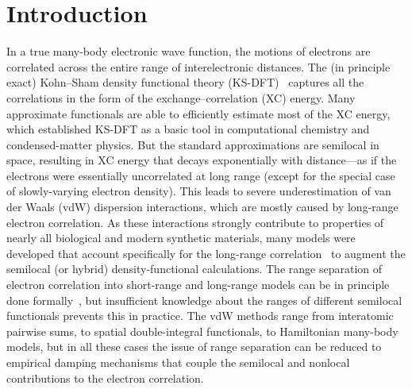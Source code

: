 \section{Introduction}

In a true many-body electronic wave function, the motions of electrons are correlated across the entire range of interelectronic distances.
The (in principle exact) Kohn--Sham density functional theory (KS-DFT)~\cite{KohnPR65} captures all the correlations in the form of the exchange--correlation (XC) energy.
Many approximate functionals are able to efficiently estimate most of the XC energy, which established KS-DFT as a basic tool in computational chemistry and condensed-matter physics.
But the standard approximations are semilocal in space, resulting in XC energy that decays exponentially with distance---as if the electrons were essentially uncorrelated at long range (except for the special case of slowly-varying electron density).
This leads to severe underestimation of van der Waals (vdW) dispersion interactions, which are mostly caused by long-range electron correlation.
As these interactions strongly contribute to properties of nearly all biological and modern synthetic materials, many models were developed that account specifically for the long-range correlation~\cite{DionPRL04,VydrovJCP10a,JohnsonJCP06,TkatchenkoPRL09,GrimmeJCP10,AmbrosettiJCP14} to augment the semilocal (or hybrid) density-functional calculations.
The range separation of electron correlation into short-range and long-range models can be in principle done formally~\cite{HermannCR17}, but insufficient knowledge about the ranges of different semilocal functionals prevents this in practice.
The vdW methods range from interatomic pairwise sums, to spatial double-integral functionals, to Hamiltonian many-body models, but in all these cases the issue of range separation can be reduced to empirical damping mechanisms that couple the semilocal and nonlocal contributions to the electron correlation.


